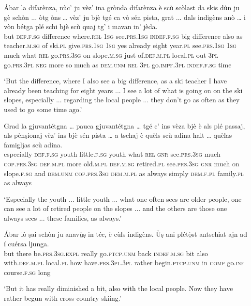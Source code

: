 \begin{linenumbers}
	\gll Ábar la difarènza, nùc’ ju vèz’ ina grònda difarènza è scù scòlast da skis dùn ju gè schòn ... òtg òns … vèz’ ju bjè tgé ca vò sén pista, grat ... dals indigèns anò … i vòn bétga plé schi bjè scù quaj tg’ i mavan in' jèda.   \\
	but \textsc{def.f.sg} difference where.\textsc{rel} \textsc{1sg} see.\textsc{prs.1sg} \textsc{indef.f.sg} big difference also as teacher.\textsc{m.sg} of ski.\textsc{pl} give.\textsc{prs.1sg} \textsc{1sg} yes already {} eight year.\textsc{pl} {} see.\textsc{prs.1sg} \textsc{1sg} much what \textsc{rel} go.\textsc{prs.3sg} on slope.\textsc{m.sg} just {} of.\textsc{def.m.pl} local.\textsc{pl} out {} \textsc{3pl} go.\textsc{prs.3pl} \textsc{neg} more so much as \textsc{dem.unm} \textsc{rel} \textsc{3pl} go.\textsc{impf.3pl} \textsc{indef.f.sg} time \\
\end{linenumbers}
\medskip
\glt `But the difference, where I also see a big difference, as a ski teacher I have already been teaching for eight years ... I see a lot of what is going on on the ski slopes, especially ... regarding the local people ... they don't go as often as they used to go some time ago.'
\medskip

\begin{linenumbers}
	\gll Grad la gjuvantétgna … pauca gjuvantétgna … tgé c’ ins vèza bjè è als plé passaj, als pènṣionaj vèz’ ins bjè sén pista … a tschaj è quèls scù adina halt … quèlas famigljas scù adina.\\
	especially \textsc{def.f.sg} youth {} little.\textsc{f.sg} youth {} what \textsc{rel} \textsc{gnr} see.\textsc{prs.3sg} much \textsc{cop.prs.3sg} \textsc{def.m.pl} more old.\textsc{m.pl} \textsc{def.m.sg} retired.\textsc{pl} see.\textsc{prs.3sg} \textsc{gnr} much on slope.\textsc{f.sg} {} and \textsc{dem.unm} \textsc{cop.prs.3sg} \textsc{dem.m.pl} as always simply {} \textsc{dem.f.pl} family.\textsc{pl} as always\\
\end{linenumbers}
\medskip
\glt `Especially the youth ... little youth ... what one often sees are older people, one can see a lot of retired people on the slopes ... and the others are those one always sees ... these families, as always.'
\medskip

\begin{linenumbers}
	\gll Ábar lò ṣai schòn ju anavù̱ṣ in téc, è cùls indigèns. Ùṣ ani plétò̱st antschiat ajn ad í cuérsa ljunga.\\
	but there be.\textsc{prs.3sg.expl} really go.\textsc{ptcp.unm} back \textsc{indef.m.sg} bit also with.\textsc{def.m.pl} local.\textsc{pl} how have.\textsc{prs.3pl.3pl} rather begin\textsc{.ptcp.unm} in \textsc{comp} go.\textsc{inf} course.\textsc{f.sg} long\\
\end{linenumbers}
\medskip
\glt `But it has really diminished a bit, also with the local people. Now they have rather begun with cross-country skiing.'
\medskip

